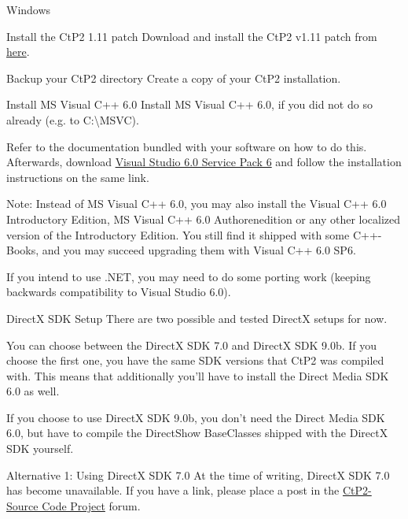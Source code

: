 \begin{section}{Windows}
\begin{subsection}{Install the CtP2 1.11 patch}
Download and install the CtP2 v1.11 patch from \href{http://apolyton.net/ctp2/}{here}.
\end{subsection}%

\begin{subsection}{Backup your CtP2 directory}
Create a copy of your CtP2 installation.
\end{subsection}%

\begin{subsection}{Install MS Visual C++ 6.0}
Install MS Visual C++ 6.0, if you did not do so already (e.g. to C:\textbackslash{}MSVC).

Refer to the documentation bundled with your software on how to do this.
Afterwards, download \href{http://msdn.microsoft.com/vstudio/downloads/updates/sp/vs6/sp6/default.aspx}{Visual Studio 6.0 Service Pack 6} and follow the installation instructions on the same link.

Note: Instead of MS Visual C++ 6.0, you may also install the Visual C++ 6.0 Introductory Edition, MS Visual C++ 6.0 Authorenedition or any other localized version of the Introductory Edition. You still find it shipped with some C++-Books, and you may succeed upgrading them with Visual C++ 6.0 SP6.

If you intend to use .NET, you may need to do some porting work (keeping backwards compatibility to Visual Studio 6.0).
\end{subsection}%

\begin{subsection}{DirectX SDK Setup}
There are two possible and tested DirectX setups for now.

You can choose between the DirectX SDK 7.0 and DirectX SDK 9.0b. If you choose the first one, you have the same SDK versions that CtP2 was compiled with. This means that additionally you'll have to install the Direct Media SDK 6.0 as well.

If you choose to use DirectX SDK 9.0b, you don't need the Direct Media SDK 6.0, but have to compile the DirectShow BaseClasses shipped with the DirectX SDK yourself.

\begin{subsubsection}{Alternative 1: Using DirectX SDK 7.0}
At the time of writing, DirectX SDK 7.0 has become unavailable. If you have a link, please place a post in the \href{http://apolyton.net/forums/forumdisplay.php?s=&forumid=213}{CtP2-Source Code Project} forum.


\end{subsubsection}
\end{subsection}
\end{section}
